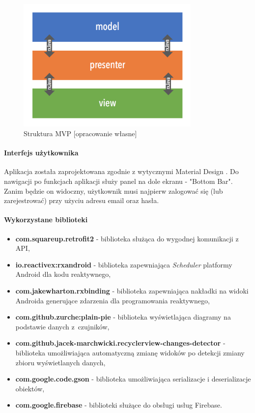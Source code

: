 \documentclass[polish,bachelor,a4paper,oneside]{ppfcmthesis}
\begin{document}
    \begin{figure}[H]
        \centering
        \includegraphics[width=9cm]{android-mvp.png}
        \caption{Struktura MVP [opracowanie własne]}
    \end{figure}

    \paragraph{Interfejs użytkownika} Aplikacja została zaprojektowana zgodnie z wytycznymi Material Design \cite{MDESIGN}.
    Do nawigacji po funkcjach aplikacji służy panel na dole ekranu - "Bottom Bar".
    Zanim będzie on widoczny, użytkownik musi najpierw zalogować się (lub zarejestrować) przy użyciu adresu email oraz hasła.

    \paragraph{Wykorzystane biblioteki}
    \begin{itemize}
        \item \textbf{com.squareup.retrofit2} - biblioteka służąca do wygodnej komunikacji z API,
        \item \textbf{io.reactivex:rxandroid} - biblioteka zapewniająca \textit{Scheduler} platformy Android dla kodu reaktywnego,
        \item \textbf{com.jakewharton.rxbinding} - biblioteka zapewniająca nakładki na widoki Androida generujące zdarzenia dla programowania reaktywnego,
        \item \textbf{com.github.zurche:plain-pie} - biblioteka wyświetlająca diagramy na podstawie danych z~czujników,
        \item \textbf{com.github.jacek-marchwicki.recyclerview-changes-detector} - biblioteka umożliwiająca automatyczną zmianę widoków po detekcji zmiany zbioru wyświetlanych danych,
        \item \textbf{com.google.code.gson} - biblioteka umożliwiająca serializacje i deserializacje obiektów,
        \item \textbf{com.google.firebase} - biblioteki służące do obsługi usług Firebase.
    \end{itemize}
\end{document}
